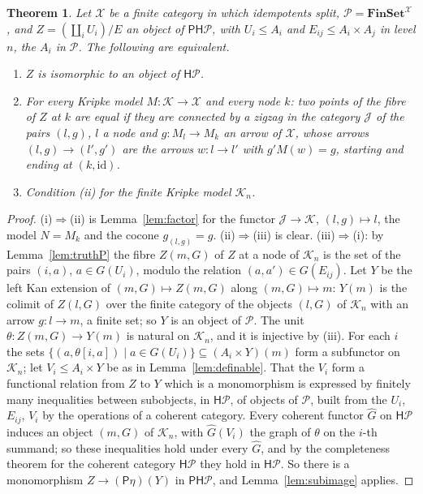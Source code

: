 \documentclass[11pt]{amsart}
\newtheorem{thm}{Theorem}[section]
\theoremstyle{definition}
\newcommand{\PP}{\mathsf P}
\newcommand{\HH}{\mathsf H}
\newcommand{\cK}{\mathcal K}
\begin{document}
\begin{thm}\label{thm:presheaf}
Let $\mathcal X$ be a finite category in which idempotents split,
$\mathcal P=\mathbf{FinSet}^{\mathcal X}$, and $Z=(\coprod_iU_i)/E$ an
object of $\PP\HH\mathcal P$, with $U_i\le A_i$ and $E_{ij}\le A_i
\times A_j$ in level $n$, the $A_i$ in $\mathcal P$. The following are
equivalent.
\begin{enumerate}
\item[(i)] $Z$ is isomorphic to an object of $\HH\mathcal P$.
\item[(ii)] For every Kripke model $M\colon\cK\to\mathcal X$ and every
node $k$: two points of the fibre of $Z$ at $k$ are equal if they are
connected by a zigzag in the category $\mathcal J$ of the pairs
$(l,g)$, $l$ a node and $g\colon M_l\to M_k$ an arrow of $\mathcal X$,
whose arrows $(l,g)\to(l',g')$ are the arrows $w\colon l\to l'$ with
$g'M(w)=g$, starting and ending at $(k,\mathrm{id})$.
\item[(iii)] Condition (ii) for the finite Kripke model $\cK_n$.
\end{enumerate}
\end{thm}
\begin{proof}
(i)$\Rightarrow$(ii) is Lemma~\ref{lem:factor} for the functor
$\mathcal J\to\cK$, $(l,g)\mapsto l$, the model $N=M_k$ and the cocone
$g_{(l,g)}=g$. (ii)$\Rightarrow$(iii) is clear. (iii)$\Rightarrow$(i):
by Lemma~\ref{lem:truthP} the fibre $Z(m,G)$ of $Z$ at a node of
$\cK_n$ is the set of the pairs $(i,a)$, $a\in G(U_i)$, modulo the
relation $(a,a')\in G(E_{ij})$. Let $Y$ be the left Kan extension of
$(m,G)\mapsto Z(m,G)$ along $(m,G)\mapsto m$: $Y(m)$ is the colimit of
$Z(l,G)$ over the finite category of the objects $(l,G)$ of $\cK_n$
with an arrow $g\colon l\to m$, a finite set; so $Y$ is an object of
$\mathcal P$. The unit $\theta\colon Z(m,G)\to Y(m)$ is natural on
$\cK_n$, and it is injective by (iii). For each $i$ the sets
$\{(a,\theta[i,a])\mid a\in G(U_i)\}\subseteq(A_i\times Y)(m)$ form a
subfunctor on $\cK_n$; let $V_i\le A_i\times Y$ be as in
Lemma~\ref{lem:definable}. That the $V_i$ form a functional relation
from $Z$ to $Y$ which is a monomorphism is expressed by finitely many
inequalities between subobjects, in $\HH\mathcal P$, of objects of
$\mathcal P$, built from the $U_i$, $E_{ij}$, $V_i$ by the operations
of a coherent category. Every coherent functor $\hat G$ on
$\HH\mathcal P$ induces an object $(m,G)$ of $\cK_n$, with $\hat G(V_i)$
the graph of $\theta$ on the $i$-th summand; so these inequalities
hold under every $\hat G$, and by the completeness theorem for the
coherent category $\HH\mathcal P$ they hold in $\HH\mathcal P$. So
there is a monomorphism $Z\to(\PP\eta)(Y)$ in $\PP\HH\mathcal P$, and
Lemma~\ref{lem:subimage} applies.
\end{proof}
\end{document}
